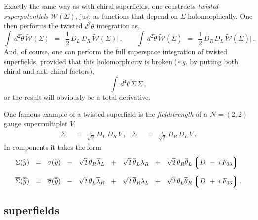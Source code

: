 \documentclass[epsfig,12pt]{article}
\def\beq{\begin{equation}}
\def\eeq{\end{equation}}
\newcommand{\ntwot}{${\mathcal N}= \left(2,2\right) $ }
\newcommand{\ntwoon}{${\mathcal N}= \left(0,2\right)$}
\newcommand{\cw}{{\mathcal W}}
\newcommand{\wt}{\widetilde}
\newcommand{\ov}{\overline}
\newcommand{\lgr}{\left\lgroup}
\newcommand{\rgr}{\right\rgroup}
\begin{document}
	Exactly the same way as with chiral superfields, one constructs {\it twisted superpotentials}
	$ \wt\cw(\Sigma) $, just as functions that depend on $ \Sigma $ holomorphically.
	One then performs the twisted $ d^2\tilde\theta $ integration as,
\beq
	\int\, d^2\tilde\theta\, \wt{\cw}(\Sigma)    ~~=~~    \frac{1}{2}\,\ov D{}_L\, D_R\, \wt{\cw}(\Sigma)\Big|\,,
	\qquad
	\int\, d^2\ov{\tilde\theta}\, \ov{\wt{\cw}}(\ov\Sigma)    ~~=~~    \frac{1}{2}\,\ov D{}_R\, D_L\, \ov{\wt{\cw}}(\ov\Sigma)\Big|\,.
\eeq
	And, of course, one can perform the full superspace integration of twisted superfields, provided
	that this holomorphicity is broken ({\it e.g.} by putting both chiral and anti-chiral factors),
\beq
	\int\, d^4\theta\, \ov\Sigma\, \Sigma\,,
\eeq
	or the result will obviously be a total derivative.


	One famous example of a twisted superfield is the {\it fieldstrength}
	of a \ntwot gauge supermultiplet $ V $,
\begin{align}
	\Sigma    & ~~=~~    \frac{i}{\sqrt 2}\, D_L\, \ov D{}_R\, V\,,
	&
	\ov \Sigma    & ~~=~~    \frac{i}{\sqrt 2}\, D_R\, \ov D{}_L\, V\,.
\end{align}
	In components it takes the form
\begin{align*}
	\Sigma(\wt y)    & ~~=~~    \sigma(\wt y)  ~~-~~  \sqrt{2}\, \theta_R \ov\lambda{}_L
						   ~~+~~  \sqrt{2}\, \ov\theta{}_L \lambda_R
						   ~~+~~  \sqrt{2}\, \theta_R \ov\theta{}_L \lgr D ~-~ i\, F_{03} \rgr
	\\[2mm]
	\ov\Sigma(\ov{\wt y})    & ~~=~~    \ov\sigma(\ov{\wt y})  ~~-~~ \sqrt{2}\, \theta_L \ov\lambda{}_R
								   ~~+~~ \sqrt{2}\, \ov\theta{}_R \lambda_L
								   ~~+~~ \sqrt{2}\, \theta_L \ov\theta{}_R \lgr D ~+~ i\, F_{03} \rgr
	.
\end{align*}




\subsection{\boldmath{\ntwoon} superfields}
\end{document}
